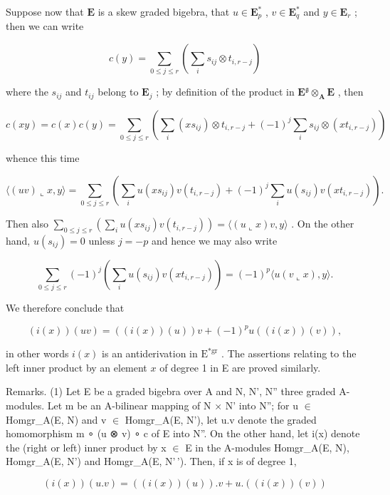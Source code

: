 Suppose now that \(\mathbf{E}\) is a skew graded bigebra, that \(u\in \mathbf{E}_p^*\) , \(v\in \mathbf{E}_q^*\) and \(y\in \mathbf{E}_r\) ; then we can write

\[
c (y) = \sum_ {0 \leqslant j \leqslant r} \left(\sum_ {i} s _ {i j} \otimes t _ {i, r - j}\right)
\]

where the \(s_{ij}\) and \(t_{ij}\) belong to \(\mathbf{E}_j\) ; by definition of the product in \(\mathbf{E}^{\mathfrak{g}} \otimes_{\mathbf{A}} \mathbf{E}\) , then

\[
c (x y) = c (x) c (y) = \sum_ {0 \leqslant j \leqslant r} \left(\sum_ {i} \left(x s _ {i j}\right) \otimes t _ {i, r - j} + (- 1) ^ {j} \sum_ {i} s _ {i j} \otimes \left(x t _ {i, r - j}\right)\right)
\]

whence this time

\[
\langle (u v) \llcorner x, y \rangle = \sum_ {0 \leqslant j \leqslant r} \left(\sum_ {i} u \left(x s _ {i j}\right) v \left(t _ {i, r - j}\right) + (- 1) ^ {j} \sum_ {i} u \left(s _ {i j}\right) v \left(x t _ {i, r - j}\right)\right).
\]

Then also \(\sum_{0\leqslant j\leqslant r}\left(\sum_{i}u(xs_{ij})v(t_{i,r - j})\right) = \langle (u\llcorner x)v,y\rangle\) . On the other hand, \(u(s_{ij}) = 0\) unless \(j = -p\) and hence we may also write

\[
\sum_ {0 \leqslant j \leqslant r} (- 1) ^ {j} \left(\sum_ {i} u (s _ {i j}) v (x t _ {i, r - j})\right) = (- 1) ^ {p} \langle u (v \llcorner x), y \rangle .
\]

We therefore conclude that

\[
(i (x)) (u v) = ((i (x)) (u)) v + (- 1) ^ {p} u ((i (x)) (v)),\tag{65}
\]

in other words \(i(x)\) is an antiderivation in \(\mathrm{E}^{*\mathrm{gr}}\) . The assertions relating to the left inner product by an element \(x\) of degree 1 in E are proved similarly.

Remarks. (1) Let E be a graded bigebra over A and N, N', N'' three graded A-modules. Let m be an A-bilinear mapping of N × N' into N''; for u \ensuremath{\in} Homgr\_A(E, N) and v \ensuremath{\in} Homgr\_A(E, N'), let u.v denote the graded homomorphism m ∘ (u ⊗ v) ∘ c of E into N''. On the other hand, let i(x) denote the (right or left) inner product by x \ensuremath{\in} E in the A-modules Homgr\_A(E, N), Homgr\_A(E, N') and Homgr\_A(E, N'\,'). Then, if x is of degree 1,

\[
(i (x)) (u. v) = ((i (x)) (u)). v + u. ((i (x)) (v))
\]

